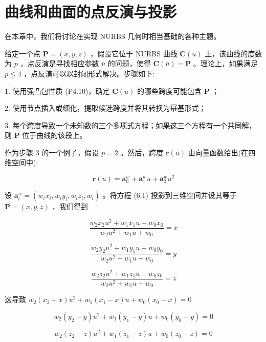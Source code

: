 \documentclass[../main.tex]{subfiles}
\begin{document}
\section{曲线和曲面的点反演与投影}

在本章中，我们将讨论在实现 NURBS 几何时相当基础的各种主题。

给定一个点 \(\mathbf{P} = \left( {x,y,z}\right)\) ，假设它位于 NURBS 曲线 \(\mathbf{C}\left( u\right)\) 上，该曲线的度数为 \(p\) ，点反演是寻找相应参数 \(\bar{u}\) 的问题，使得 \(\mathbf{C}\left( \bar{u}\right)  = \mathbf{P}\) 。理论上，如果满足 \(p \leq  4\) ，点反演可以以封闭形式解决。步骤如下:

1. 使用强凸包性质 (P4.10)，确定 \(\mathbf{C}\left( u\right)\) 的哪些跨度可能包含 \(\mathbf{P}\) ；

2. 使用节点插入或细化，提取候选跨度并将其转换为幂基形式；

3. 每个跨度导致一个未知数的三个多项式方程；如果这三个方程有一个共同解，则 \(\mathbf{P}\) 位于曲线的该段上。

作为步骤 3 的一个例子，假设 \(p = 2\) 。然后，跨度 \(\mathbf{r}\left( u\right)\) 由向量函数给出(在四维空间中):

\[
\mathbf{r}\left( u\right)  = {\mathbf{a}}_{0}^{w} + {\mathbf{a}}_{1}^{w}u + {\mathbf{a}}_{2}^{w}{u}^{2} \tag{6.1}
\]

设 \({\mathbf{a}}_{i}^{w} = \left( {{w}_{i}{x}_{i},{w}_{i}{y}_{i},{w}_{i}{z}_{i},{w}_{i}}\right)\) 。将方程 (6.1) 投影到三维空间并设其等于 \(\mathbf{P} = \left( {x,y,z}\right)\) ，我们得到

\[
\frac{{w}_{2}{x}_{2}{u}^{2} + {w}_{1}{x}_{1}u + {w}_{0}{x}_{0}}{{w}_{2}{u}^{2} + {w}_{1}u + {w}_{0}} = x
\]

\[
\frac{{w}_{2}{y}_{2}{u}^{2} + {w}_{1}{y}_{1}u + {w}_{0}{y}_{0}}{{w}_{2}{u}^{2} + {w}_{1}u + {w}_{0}} = y
\]

\[
\frac{{w}_{2}{z}_{2}{u}^{2} + {w}_{1}{z}_{1}u + {w}_{0}{z}_{0}}{{w}_{2}{u}^{2} + {w}_{1}u + {w}_{0}} = z
\]

这导致 \({w}_{2}\left( {{x}_{2} - x}\right) {u}^{2} + {w}_{1}\left( {{x}_{1} - x}\right) u + {w}_{0}\left( {{x}_{0} - x}\right)  = 0\)

\[
{w}_{2}\left( {{y}_{2} - y}\right) {u}^{2} + {w}_{1}\left( {{y}_{1} - y}\right) u + {w}_{0}\left( {{y}_{0} - y}\right)  = 0
\]

\[
{w}_{2}\left( {{z}_{2} - z}\right) {u}^{2} + {w}_{1}\left( {{z}_{1} - z}\right) u + {w}_{0}\left( {{z}_{0} - z}\right)  = 0 \tag{6.2}
\]
\end{document}
